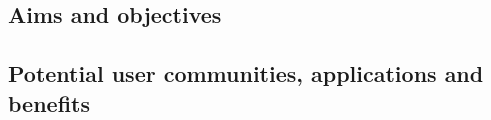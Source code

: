 \subsection{Aims and objectives}


\subsection{Potential user communities, applications and benefits}


